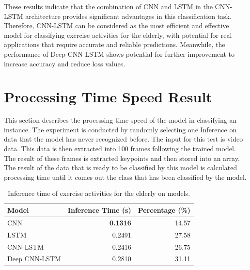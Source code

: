 These results indicate that the combination of CNN and LSTM in the CNN-LSTM architecture provides significant advantages in this classification task. Therefore, CNN-LSTM can be considered as the most efficient and effective model for classifying exercise activities for the elderly, with potential for real applications that require accurate and reliable predictions. Meanwhile, the performance of Deep CNN-LSTM shows potential for further improvement to increase accuracy and reduce loss values.

\section{Processing Time Speed Result}
\label{sec4:InferenceTime}

This section describes the processing time speed of the model in classifying an instance. The experiment is conducted by randomly selecting one Inference on data that the model has never recognized before. The input for this test is video data. This data is then extracted into 100 frames following the trained model. The result of these frames is extracted keypoints and then stored into an array. The result of the data that is ready to be classified by this model is calculated processing time until it comes out the class that has been classified by the model.

\begin{table}[h!]
	\caption{Inference time of exercise activities for the elderly on models.}
	\label{tab:InferenceTime}
	\centering
	\begin{tabular}{|l|r|r|}
		\hline
		Model         & \multicolumn{1}{l|}{Inference Time (s)} & \multicolumn{1}{l|}{Percentage (\%)} \\ \hline
		CNN           & \textbf{0.1316}                         & 14.57                                \\ \hline
		LSTM          & 0.2491                                  & 27.58                                \\ \hline
		CNN-LSTM      & 0.2416                                  & 26.75                                \\ \hline
		Deep CNN-LSTM & 0.2810                                  & 31.11                                \\ \hline
	\end{tabular}
\end{table}

